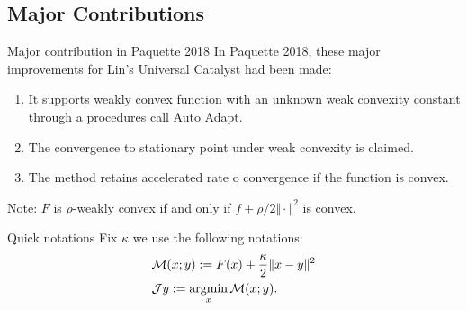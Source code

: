 \documentclass[11pt]{beamer}
\begin{document}
    \subsection{Major Contributions}
        \begin{frame}{Major contribution in Paquette 2018}
            In Paquette 2018, these major improvements for Lin's Universal Catalyst had been made: 
            \begin{enumerate}
                \item It supports weakly convex function with an unknown weak convexity constant through a procedures call Auto Adapt. 
                \item The convergence to stationary point under weak convexity is claimed. 
                \item The method retains accelerated rate o convergence if the function is convex. 
            \end{enumerate}
            Note: $F$ is $\rho$-weakly convex if and only if $f + \rho/2\Vert \cdot\Vert^2$ is convex. 
            \begin{block}{Quick notations}
                Fix $\kappa$ we use the following notations: 
                \begin{align*}
                & \mathcal M (x; y) := F(x) + \frac{\kappa}{2}\Vert x - y\Vert^2 
                \\
                & \mathcal J y := \mathop{\rm argmin}\limits_x \mathcal M (x; y). 
                \end{align*}
            \end{block}
        \end{frame}
\end{document}

